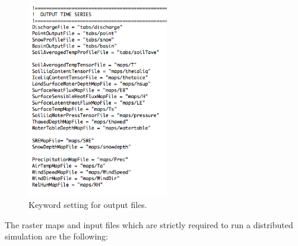 \begin{figure}[h!]
\begin{center}
   \includegraphics[width=0.55\textwidth]{./images/pic_template/output_PAR3D.png}
    \caption{Keyword setting for output files.} \label{tab:outputPAR3D}
\end{center}
\end{figure}

\clearpage
The raster maps and input files which are strictly required to run a distributed simulation are the following:

